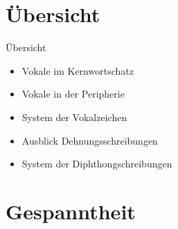 \section{Übersicht}

\begin{frame}
  {Übersicht}
  \onslide<+->
  \begin{itemize}[<+->]
    \item Vokale im Kernwortschatz
    \item Vokale in der Peripherie
      \Halbzeile
    \item System der Vokalzeichen
    \item Ausblick Dehnungsschreibungen
    \item System der Diphthongschreibungen
  \end{itemize}
\end{frame}

\section{Gespanntheit}


